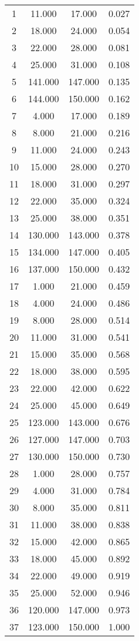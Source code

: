 % 
\begin{tabular}{cccc}
  \hline
  \hline
1 & 11.000 & 17.000 & 0.027 \\ 
  2 & 18.000 & 24.000 & 0.054 \\ 
  3 & 22.000 & 28.000 & 0.081 \\ 
  4 & 25.000 & 31.000 & 0.108 \\ 
  5 & 141.000 & 147.000 & 0.135 \\ 
  6 & 144.000 & 150.000 & 0.162 \\ 
  7 & 4.000 & 17.000 & 0.189 \\ 
  8 & 8.000 & 21.000 & 0.216 \\ 
  9 & 11.000 & 24.000 & 0.243 \\ 
  10 & 15.000 & 28.000 & 0.270 \\ 
  11 & 18.000 & 31.000 & 0.297 \\ 
  12 & 22.000 & 35.000 & 0.324 \\ 
  13 & 25.000 & 38.000 & 0.351 \\ 
  14 & 130.000 & 143.000 & 0.378 \\ 
  15 & 134.000 & 147.000 & 0.405 \\ 
  16 & 137.000 & 150.000 & 0.432 \\ 
  17 & 1.000 & 21.000 & 0.459 \\ 
  18 & 4.000 & 24.000 & 0.486 \\ 
  19 & 8.000 & 28.000 & 0.514 \\ 
  20 & 11.000 & 31.000 & 0.541 \\ 
  21 & 15.000 & 35.000 & 0.568 \\ 
  22 & 18.000 & 38.000 & 0.595 \\ 
  23 & 22.000 & 42.000 & 0.622 \\ 
  24 & 25.000 & 45.000 & 0.649 \\ 
  25 & 123.000 & 143.000 & 0.676 \\ 
  26 & 127.000 & 147.000 & 0.703 \\ 
  27 & 130.000 & 150.000 & 0.730 \\ 
  28 & 1.000 & 28.000 & 0.757 \\ 
  29 & 4.000 & 31.000 & 0.784 \\ 
  30 & 8.000 & 35.000 & 0.811 \\ 
  31 & 11.000 & 38.000 & 0.838 \\ 
  32 & 15.000 & 42.000 & 0.865 \\ 
  33 & 18.000 & 45.000 & 0.892 \\ 
  34 & 22.000 & 49.000 & 0.919 \\ 
  35 & 25.000 & 52.000 & 0.946 \\ 
  36 & 120.000 & 147.000 & 0.973 \\ 
  37 & 123.000 & 150.000 & 1.000 \\ 
   \hline
\end{tabular}
